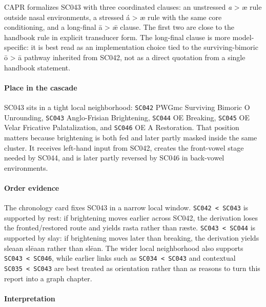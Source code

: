 \documentclass[
  british,
  a4paper,
]{article}
\begin{document}
CAPR formalizes SC043 with three coordinated clauses: an unstressed
\emph{a} \textgreater{} æ rule outside nasal environments, a stressed á
\textgreater{} æ rule with the same core conditioning, and a long-final
ā \textgreater{} ǣ clause. The first two are close to the handbook rule
in explicit transducer form. The long-final clause is more
model-specific: it is best read as an implementation choice tied to the
surviving-bimoric ō \textgreater{} ā pathway inherited from SC042, not
as a direct quotation from a single handbook statement.

\paragraph{Place in the cascade}\label{place-in-the-cascade-27}

SC043 sits in a tight local neighborhood: \texttt{SC042} PWGmc Surviving
Bimoric O Unrounding, \texttt{SC043} Anglo-Frisian Brightening,
\texttt{SC044} OE Breaking, \texttt{SC045} OE Velar Fricative
Palatalization, and \texttt{SC046} OE A Restoration. That position
matters because brightening is both fed and later partly masked inside
the same cluster. It receives left-hand input from SC042, creates the
front-vowel stage needed by SC044, and is later partly reversed by SC046
in back-vowel environments.

\paragraph{Order evidence}\label{order-evidence-27}

The chronology card fixes SC043 in a narrow local window.
\texttt{SC042\ \textless{}\ SC043} is supported by rest: if brightening
moves earlier across SC042, the derivation loses the fronted/restored
route and yields rasta rather than ræste.
\texttt{SC043\ \textless{}\ SC044} is supported by slay: if brightening
moves later than breaking, the derivation yields sleaan \textbar{}
slēaan rather than slēan. The wider local neighborhood also supports
\texttt{SC043\ \textless{}\ SC046}, while earlier links such as
\texttt{SC034\ \textless{}\ SC043} and contextual
\texttt{SC035\ \textless{}\ SC043} are best treated as orientation
rather than as reasons to turn this report into a graph chapter.

\paragraph{Interpretation}\label{interpretation-27}
\end{document}
